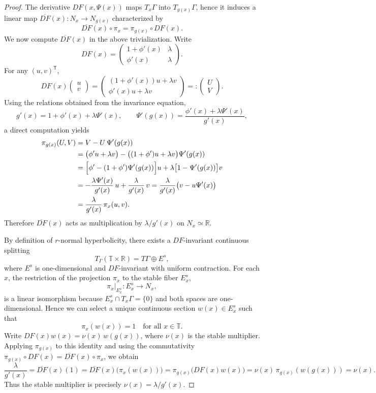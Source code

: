 \documentclass[10pt,a4paper]{amsart}
\begin{document}
\begin{proof}
The derivative $DF(x,\Psi(x))$ maps $T_x\Gamma$ into $T_{g(x)}\Gamma$,
hence it induces a linear map $\overline{DF}(x): N_x \to N_{g(x)}$ characterized by
\[
\overline{DF}(x) \circ \pi_x = \pi_{g(x)} \circ DF(x).
\]
We now compute $\overline{DF}(x)$ in the above trivialization.  Write
\[
DF(x) = \begin{pmatrix}
1+\phi'(x) & \lambda \\
\phi'(x)   & \lambda
\end{pmatrix}.
\]
For any $(u,v)^{\mathsf{T}}$,
\[
DF(x)\begin{pmatrix}u\\ v\end{pmatrix}
= \begin{pmatrix}
(1+\phi'(x))u + \lambda v \\
\phi'(x)u + \lambda v
\end{pmatrix}
=: \begin{pmatrix} U \\ V \end{pmatrix}.
\]
Using the relations obtained from the invariance equation,
\[
g'(x) = 1+\phi'(x)+\lambda\Psi'(x),\qquad
\Psi'(g(x)) = \frac{\phi'(x)+\lambda\Psi'(x)}{g'(x)},
\]
a direct computation yields
\begin{align*}
\pi_{g(x)}(U,V) &= V - U\,\Psi'(g(x)) \\
&= \bigl(\phi'u+\lambda v\bigr) - \bigl((1+\phi')u+\lambda v\bigr)\Psi'(g(x)) \\
&= \Bigl[\phi' - (1+\phi')\Psi'(g(x))\Bigr]u + \lambda\bigl[1-\Psi'(g(x))\bigr]v \\
&= -\frac{\lambda\Psi'(x)}{g'(x)}\,u + \frac{\lambda}{g'(x)}\,v
 = \frac{\lambda}{g'(x)}\bigl(v-u\Psi'(x)\bigr) \\
&= \frac{\lambda}{g'(x)}\,\pi_x(u,v).
\end{align*}
Therefore $\overline{DF}(x)$ acts as multiplication by $\lambda/g'(x)$ on $N_x\simeq\mathbb{R}$.

\medskip

By definition of $r$-normal hyperbolicity, there exists a $DF$-invariant continuous splitting
\[
T_\Gamma(\mathbb{T}\times\mathbb{R}) = T\Gamma \oplus E^s,
\]
where $E^s$ is one-dimensional and $DF$-invariant with uniform contraction.  For each $x$,
the restriction of the projection $\pi_x$ to the stable fiber $E^s_x$,
\[
\pi_x|_{E^s_x} : E^s_x \longrightarrow N_x,
\]
is a linear isomorphism because $E^s_x \cap T_x\Gamma = \{0\}$ and both spaces are
one-dimensional.  Hence we can select a unique continuous section $w(x)\in E^s_x$ such that
\[
\pi_x(w(x)) = 1 \quad \text{for all } x\in\mathbb{T}.
\]
Write $DF(x)w(x) = \nu(x)\, w(g(x))$, where $\nu(x)$ is the stable multiplier.
Applying $\pi_{g(x)}$ to this identity and using the commutativity
$\pi_{g(x)}\circ DF(x) = \overline{DF}(x)\circ\pi_x$, we obtain
\[
\frac{\lambda}{g'(x)} = \overline{DF}(x)(1)
= \overline{DF}(x)\bigl(\pi_x(w(x))\bigr)
= \pi_{g(x)}\bigl(DF(x)w(x)\bigr)
= \nu(x)\,\pi_{g(x)}(w(g(x)))
= \nu(x).
\]
Thus the stable multiplier is precisely $\nu(x)=\lambda/g'(x)$.


\end{proof}
\end{document}
